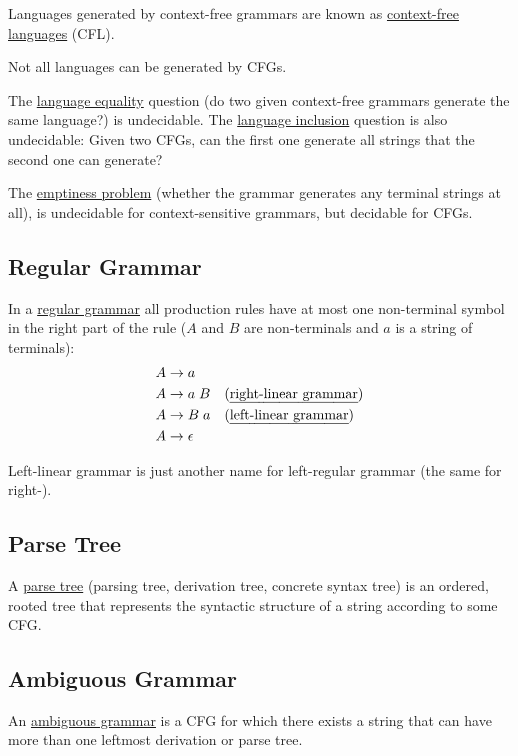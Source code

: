 \documentclass[sigsoft,12pt,nonacm]{acmart}
\renewcommand\emph[1]{\ul{#1}}
\begin{document}
Languages generated by context-free grammars are known as \emph{context-free languages} (CFL).

Not all languages can be generated by CFGs.

The \emph{language equality} question (do two given context-free grammars generate the same language?) is undecidable.
The \emph{language inclusion} question is also undecidable: Given two CFGs, can the first one generate all strings that the second one can generate?

The \emph{emptiness problem} (whether the grammar generates any terminal strings at all), is undecidable for context-sensitive grammars, but decidable for CFGs.

\subsection{Regular Grammar}

In a \emph{regular grammar} all production rules have at most one non-terminal symbol in the right part of the rule
($A$ and $B$ are non-terminals and $a$ is a string of terminals):
\begin{equation*}
\begin{split}
A &\to a \\
A &\to a \; B \quad \text{(\emph{right-linear grammar})} \\
A &\to B \; a \quad \text{(\emph{left-linear grammar})} \\
A &\to \epsilon \\
\end{split}
\end{equation*}

Left-linear grammar is just another name for left-regular grammar (the same for right-).

\subsection{Parse Tree}

A \emph{parse tree} (parsing tree, derivation tree, concrete syntax tree) is an ordered, rooted tree that represents the syntactic structure of a string according to some CFG.

\begin{tikzpicture}

\end{tikzpicture}

\subsection{Ambiguous Grammar}

An \emph{ambiguous grammar} is a CFG for which there exists a string that can have more than one leftmost derivation or parse tree.
\end{document}
